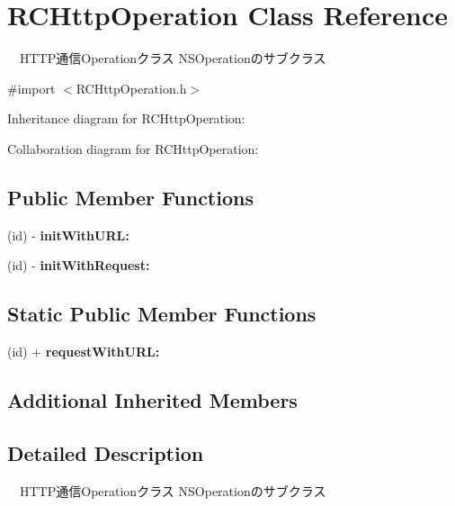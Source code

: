 \hypertarget{interface_r_c_http_operation}{\section{R\-C\-Http\-Operation Class Reference}
\label{interface_r_c_http_operation}
}


　\-H\-T\-T\-P通信\-Operationクラス N\-S\-Operationのサブクラス  




{\ttfamily \#import $<$R\-C\-Http\-Operation.\-h$>$}



Inheritance diagram for R\-C\-Http\-Operation\-:


Collaboration diagram for R\-C\-Http\-Operation\-:
\subsection*{Public Member Functions}
\begin{DoxyCompactItemize}
\item 
\hypertarget{interface_r_c_http_operation_a16edd65f82ce919e6dec0a11fa03539a}{(id) -\/ {\bfseries init\-With\-U\-R\-L\-:}}\label{interface_r_c_http_operation_a16edd65f82ce919e6dec0a11fa03539a}

\item 
\hypertarget{interface_r_c_http_operation_ae51af29ed784e54100c02a551da371ff}{(id) -\/ {\bfseries init\-With\-Request\-:}}\label{interface_r_c_http_operation_ae51af29ed784e54100c02a551da371ff}

\end{DoxyCompactItemize}
\subsection*{Static Public Member Functions}
\begin{DoxyCompactItemize}
\item 
\hypertarget{interface_r_c_http_operation_a0efa62cdeb53b4a64f1760d865deedae}{(id) + {\bfseries request\-With\-U\-R\-L\-:}}\label{interface_r_c_http_operation_a0efa62cdeb53b4a64f1760d865deedae}

\end{DoxyCompactItemize}
\subsection*{Additional Inherited Members}


\subsection{Detailed Description}
　\-H\-T\-T\-P通信\-Operationクラス N\-S\-Operationのサブクラス 

